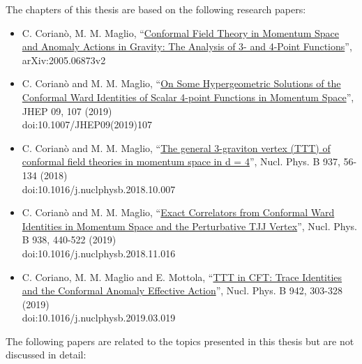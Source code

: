 \documentclass[a4paper,11pt,openright,twoside]{book}
\numberwithin{equation}{section}
\begin{document}
\noindent The chapters of this thesis are based on the following research papers:
\begin{itemize}
	\item C. Corianò, M. M. Maglio, “\href{https://arxiv.org/abs/2005.06873}{Conformal Field Theory in Momentum Space and Anomaly Actions in Gravity: The Analysis of 3- and 4-Point Functions}”,     arXiv:2005.06873v2
	\item 	C. Corianò and M. M. Maglio, “\href{https://doi.org/10.1007/JHEP09(2019)107}{On Some Hypergeometric Solutions of the Conformal Ward Identities of Scalar 4-point Functions in Momentum Space}”, JHEP 09, 107 (2019)\\ doi:10.1007/JHEP09(2019)107 
	\item 	C. Corianò and M. M. Maglio, “\href{https://doi.org/10.1016/j.nuclphysb.2018.10.007}{The general 3-graviton vertex (TTT) of conformal field theories in momentum space in d = 4}”, Nucl. Phys. B 937, 56-134 (2018) \\ doi:10.1016/j.nuclphysb.2018.10.007 
	\item 	C. Corianò and M. M. Maglio, “\href{https://doi.org/10.1016/j.nuclphysb.2018.11.016}{Exact Correlators from Conformal Ward Identities in Momentum Space and the Perturbative TJJ Vertex}”, Nucl. Phys. B 938, 440-522 (2019)  \\
	doi:10.1016/j.nuclphysb.2018.11.016 
	\item C. Coriano, M. M. Maglio and E. Mottola, “\href{https://doi.org/10.1016/j.nuclphysb.2019.03.019}{TTT in CFT: Trace Identities and the Conformal Anomaly Effective Action}”, Nucl. Phys. B 942, 303-328 (2019) \\doi:10.1016/j.nuclphysb.2019.03.019  
	
\end{itemize}	
The following papers are related to the topics presented in this thesis but are not discussed in detail:
\end{document}
